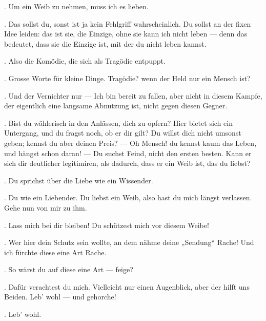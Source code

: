 . Um ein Weib zu nehmen, muss ich es lieben.
\par

. Das sollst du, sonst ist ja kein Fehlgriff wahrscheinlich. Du sollst an der fixen Idee leiden: das ist sie, die Einzige, ohne sie kann ich nicht leben — denn das bedeutet, dass sie die Einzige ist, mit der du nicht leben kannst.
\par

. Also die Komödie, die sich als Tragödie entpuppt.
\par

. Grosse Worte für kleine Dinge. Tragödie? wenn der Held nur ein Mensch ist?
\par

. Und der Vernichter nur  — Ich bin bereit zu fallen, aber nicht in diesem Kampfe, der eigentlich eine langsame Abnutzung ist, nicht gegen diesen Gegner.
\par

. Bist du wählerisch in den Anlässen, dich zu opfern? Hier bietet sich ein Untergang, und du fragst noch, ob er dir gilt? Du willst dich nicht umsonst geben; kennst du aber deinen Preis? — Oh Mensch! du kennst kaum das Leben, und hängst schon daran! — Du suchst  Feind, nicht den ersten besten. Kann er sich dir deutlicher legitimiren, als dadurch, dass er ein Weib ist, das du liebst?
\par

. Du sprichst über die Liebe wie ein Wissender.
\par

. Du wie ein Liebender. Du liebst ein Weib, also hast du mich längst verlassen. Gehe nun von mir zu ihm.
\par

. Lass mich bei dir bleiben! Du schützest mich vor diesem Weibe!
\par

. Wer hier dein Schutz sein wollte, an dem nähme deine „Sendung“ Rache! Und ich fürchte diese eine Art Rache.
\par

. So wärst du auf diese eine Art — feige?
\par

. Dafür verachtest du mich. Vielleicht nur einen Augenblick, aber der hilft uns Beiden. Leb’ wohl — und gehorche!
\par

. Leb’ wohl.
\par

